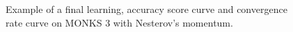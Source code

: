 \begin{appendices}
\begin{figure}[H]
\begin{subfigure}{0.40\textwidth}
                    \label{fig:monks_3_ACC_SGD}
                \end{subfigure}
                \begin{subfigure}{0.40\textwidth}
                    \caption{}
                    \label{fig:monks_3_NORM_SGD}
                \end{subfigure}
                \caption{Example of a final learning, accuracy score curve and
                convergence rate curve on MONKS 3 with Nesterov's momentum.}
                \label{fig:monks_1_SGD}
            \end{figure}





\end{appendices}
